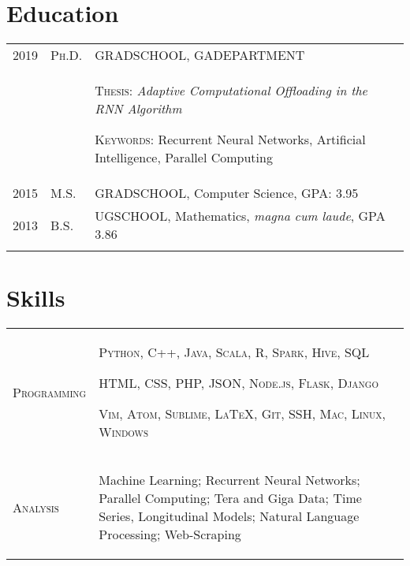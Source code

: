 \documentclass[a4paper,10pt]{article}
\begin{document}
\section{Education}
\begin{supertabular}{p{2cm} p{1.0cm} p{13.9cm}}
	\textsc{2019}		&		\textsc{Ph.D.} & \textsc{GRADSCHOOL}, \small GADEPARTMENT \\
					&&		 \begin{enumerate*}[label =$\diamond$, itemjoin={\newline}]
							 \item \footnotesize \textsc{Thesis:} \emph{Adaptive Computational Offloading in the RNN Algorithm}
							 \item \footnotesize  \textsc{Keywords:} Recurrent Neural Networks, Artificial Intelligence, Parallel Computing
							 \end{enumerate*}  \\
	\textsc{2015} 	& 	\textsc{M.S.} & \textsc{GRADSCHOOL}, \small Computer Science, GPA: 3.95  \\
	\textsc{2013} 	& 	\textsc{B.S.} & \textsc{UGSCHOOL}, \small Mathematics, \emph{magna cum laude}, GPA 3.86 \\
	 \\
\end{supertabular}


\section{Skills}
\begin{supertabular}{p{3.4cm} p{13.9cm}}

	\textsc{Programming}		& \begin{enumerate*}[label =$\diamond$, itemjoin={\newline}]
																\item \small \textsc{Python, C++, Java, Scala, R, Spark, Hive, SQL}
																\item \small \textsc{HTML, CSS, PHP, JSON, Node.js, Flask, Django}
																\item \small \textsc{Vim, Atom, Sublime, {\fb \LaTeX}, Git, SSH, Mac, Linux, Windows }
																\end{enumerate*} \vspace{2mm} \\


	\textsc{Analysis}				& \begin{enumerate*}[label =$\diamond$, itemjoin={\newline}]
                                \item \small Machine Learning; Recurrent Neural Networks; Parallel Computing; Tera and Giga Data; Time Series, Longitudinal Models; Natural Language Processing; Web-Scraping \end{enumerate*}  \vspace{1mm} \\



\end{supertabular}
\end{document}
